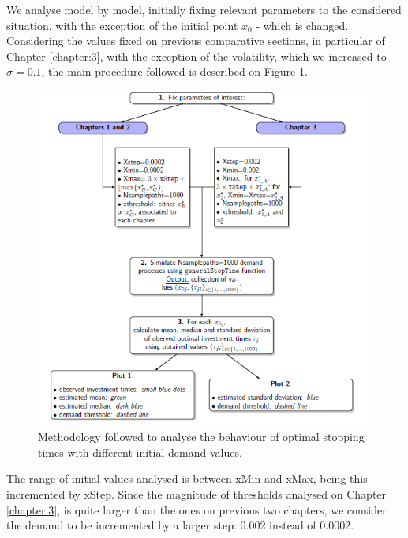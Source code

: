 We analyse model by model, initially fixing relevant parameters to the considered situation, with the exception of the initial point $x_0$ - which is changed.
Considering the values fixed on previous comparative sections, in particular of Chapter \ref{chapter:3}, with the exception of the volatility, which we increased to $\sigma=0.1$, the main procedure followed is described on Figure \ref{method1}.


\begin{figure}[!htb]
	\centering
	\includegraphics[width=\textwidth]{StopTime/method1.PNG}
	\caption{Methodology followed to analyse the behaviour of optimal stopping times with different initial demand values.}
	\label{method1}
\end{figure}


The range of initial values analysed is between xMin and xMax, being this incremented by xStep.
Since the magnitude of thresholds analysed on Chapter \ref{chapter:3}, is quite larger than the ones on previous two chapters, we consider the demand to be incremented by a larger step: 0.002 instead of 0.0002.



